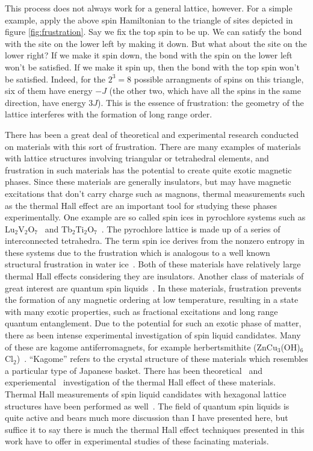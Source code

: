\documentclass{thesis-umich}
\begin{document}
This process does not always work for a general lattice, however. For a simple example, apply the above spin Hamiltonian to the triangle of sites depicted in figure \ref{fig:frustration}. Say we fix the top spin to be up. We can satisfy the bond with the site on the lower left by making it down. But what about the site on the lower right? If we make it spin down, the bond with the spin on the lower left won't be satisfied. If we make it spin up, then the bond with the top spin won't be satisfied. Indeed, for the $2^3 = 8$ possible arrangments of spins on this triangle, six of them have energy $-J$ (the other two, which have all the spins in the same direction, have energy $3J$). This is the essence of frustration: the geometry of the lattice interferes with the formation of long range order.

There has been a great deal of theoretical and experimental research conducted on materials with this sort of frustration. There are many examples of materials with lattice structures involving triangular or tetrahedral elements, and frustration in such materials has the potential to create quite exotic magnetic phases. Since these materials are generally insulators, but may have magnetic excitations that don't carry charge such as magnons, thermal measurements such as the thermal Hall effect are an important tool for studying these phases experimentally. One example are so called spin ices in pyrochlore systems such as Lu$_2$V$_2$O$_7$~\cite{Onose2010} and Tb$_2$Ti$_2$O$_7$~\cite{Hirschberger2015}. The pyrochlore lattice is made up of a series of interconnected tetrahedra. The term spin ice derives from the nonzero entropy in these systems due to the frustration which is analogous to a well known structural frustration in water ice~\cite{Giauque1936}. Both of these materials have relatively large thermal Hall effects considering they are insulators. Another class of materials of great interest are quantum spin liquids~\cite{Anderson1973}. In these materials, frustration prevents the formation of any magnetic ordering at low temperature, resulting in a state with many exotic properties, such as fractional excitations and long range quantum entanglement. Due to the potential for such an exotic phase of matter, there as been intense experimental investigation of spin liquid candidates. Many of these are kagome antiferromagnets, for example herbertsmithite (ZnCu$_3$(OH)$_6$Cl$_2$)~\cite{Asaba2014}. ``Kagome'' refers to the crystal structure of these materials which resembles a particular type of Japanese basket. There has been theoretical~\cite{Owerre2017} and experiemental~\cite{Doki2018} investigation of the thermal Hall effect of these materials. Thermal Hall measurements of spin liquid candidates with hexagonal lattice structures have been performed as well~\cite{Kasahara2018}. The field of quantum spin liquids is quite active and bears much more discussion than I have presented here, but suffice it to say there is much the thermal Hall effect techniques presented in this work have to offer in experimental studies of these facinating materials.
\end{document}
